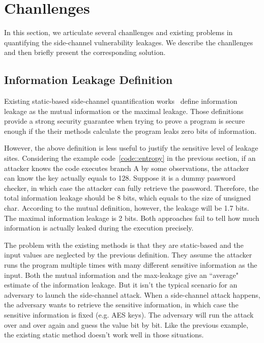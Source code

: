 \section{Chanllenges}

In this section, we articulate several chanllenges and existing problems
in quantifying the side-channel vulnerability leakages. We describe the
chanllenges and then briefly present the corresponding solution.

\subsection{Information Leakage Definition}
Existing static-based side-channel quantification works~\cite{182946} define information leakage
as the mutual information or the maximal leakage. Those definitions provide a strong security guarantee
when trying to prove a program is secure enough if the their methods calculate the program 
leaks zero bits of information.

However, the above definition is less useful to justify the sensitive level of leakage sites. 
Considering the example code~\ref{code::entropy} in the previous section, if an attacker knows the
code executes branch A by some observations, the attacker can know the key actually equals to 128. 
Suppose it is a dummy password checker, in which case the attacker can fully retrieve the password.
Therefore, the total information leakage should be 8 bits, which equals to the size
of unsigned char. 
According to the mutual definition, however, the leakage will be 1.7 bits. The maximal information
leakage is 2 bits. Both approaches fail to tell how much information is actually leaked
during the execution precisely.

The problem with the existing methods is that they are static-based and the 
input values are neglected by the previous definition. 
They assume the attacker runs the program multiple times with many different sensitive 
information as the input. Both the mutual information and the max-leakage give an ``average" 
estimate of the information leakage. But it isn't the typical scenario for an adversary to 
launch the side-channel attack. When a side-channel attack happens, the adversary wants 
to retrieve the sensitive information, in which case the sensitive information is fixed (e.g. AES keys). 
The adversary will run the attack over and over again and guess the value bit by bit. Like the 
previous example, the existing static method doesn’t work well in those situations.

